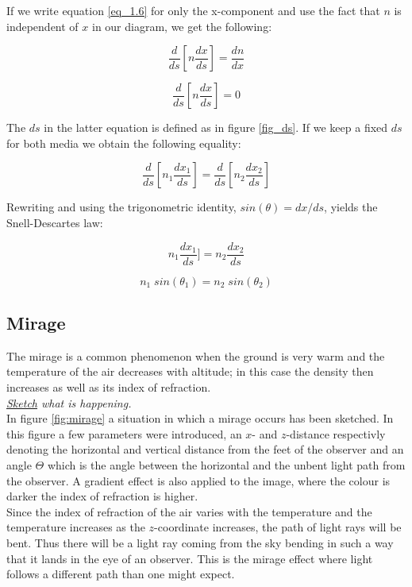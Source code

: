 \documentclass{article}
\begin{document}
If we write equation \ref{eq_1.6} for only the x-component and use the fact that $n$ is independent of $x$ in our diagram, we get the following:

\begin{equation}
	\frac{d}{ds} \left[ n \frac{d x}{ds} \right] = \frac{d n}{dx}
\end{equation}

\begin{equation}
	\frac{d}{ds} \left[ n \frac{d x}{ds} \right] = 0
\end{equation}

The $ds$ in the latter equation is defined as in figure \ref{fig_ds}. If we keep a fixed $ds$ for both media we obtain the following equality:

\begin{equation}
	\frac{d}{ds} \left[ n_1 \frac{d x_1}{ds} \right] = \frac{d}{ds} \left[ n_2 \frac{d x_2}{ds} \right]
\end{equation}

Rewriting and using the trigonometric identity, $sin(\theta)= dx/ds$, yields the Snell-Descartes law:

\begin{equation}
	n_1 \frac{d x_1}{ds}]=n_2 \frac{d x_2}{ds}
\end{equation}

\begin{equation}
	n_1 \; sin(\theta _1) = n_2 \; sin(\theta _2)
\end{equation}

\subsection{Mirage}
The mirage is a common phenomenon when the ground is very warm and the temperature of the air decreases with altitude; in this case the density then increases as well as its index of refraction.\\
\vspace{3mm}
\textit{\underline{Sketch} what is happening.}\\
In figure \ref{fig:mirage} a situation in which a mirage occurs has been sketched. In this figure a few parameters were introduced, an $x$- and $z$-distance respectivly denoting the horizontal and vertical distance from the feet of the observer and an angle $\Theta$ which is the angle between the horizontal and the unbent light path from the observer. A gradient effect is also applied to the image, where the colour is darker the index of refraction is higher.\\
Since the index of refraction of the air varies with the temperature and the temperature increases as the $z$-coordinate increases, the path of light rays will be bent. Thus there will be a light ray coming from the sky bending in such a way that it lands in the eye of an observer. This is the mirage effect where light follows a different path than one might expect.\\
\end{document}
